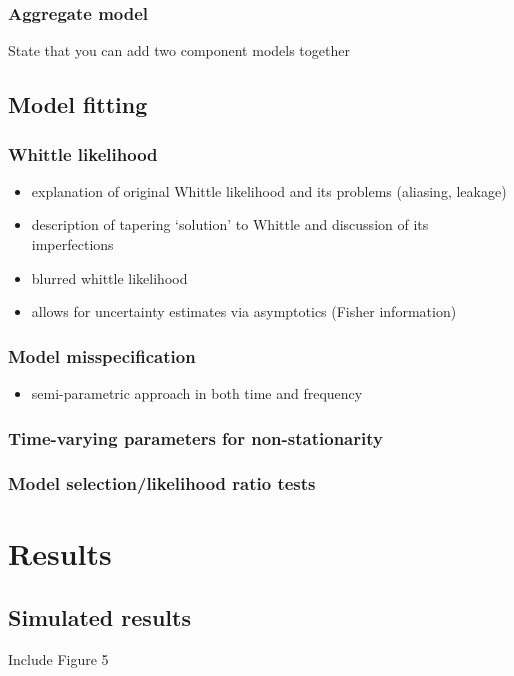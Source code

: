 \documentclass{stat572Style}
\begin{document}
		\subsubsection{Aggregate model}
			State that you can add two component models together
	
	\subsection{Model fitting}
		\subsubsection{Whittle likelihood}
				
			\begin{itemize}
				\item explanation of original Whittle likelihood and its problems (aliasing, leakage)
				\item description of tapering `solution' to Whittle and discussion of its imperfections
				\item blurred whittle likelihood 
				\item allows for uncertainty estimates via asymptotics (Fisher information)
			\end{itemize}
	
		\subsubsection{Model misspecification}
			\begin{itemize}
				\item semi-parametric approach in both time and frequency
			\end{itemize}
		\subsubsection{Time-varying parameters for non-stationarity}
		
		\subsubsection{Model selection/likelihood ratio tests}
	



\section{Results}

	\subsection{Simulated results}
		Include Figure 5
		
\end{document}
